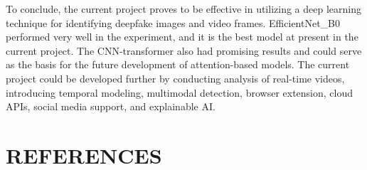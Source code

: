 \documentclass[12pt,a4paper]{report}
\begin{document}
To conclude, the current project proves to be effective in utilizing a deep learning technique for identifying deepfake images and video frames. EfficientNet\_B0 performed very well in the experiment, and it is the best model at present in the current project. The CNN-transformer also had promising results and could serve as the basis for the future development of attention-based models. The current project could be developed further by conducting analysis of real-time videos, introducing temporal modeling, multimodal detection, browser extension, cloud APIs, social media support, and explainable AI.


\chapter*{REFERENCES}
\end{document}
